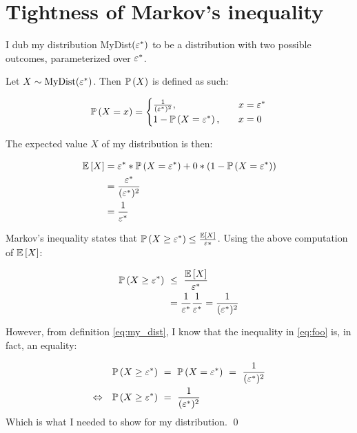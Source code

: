 \section{Tightness of Markov's inequality}

I dub my distribution MyDist$(\varepsilon^\ast)$ to be a distribution with two possible
outcomes, parameterized over $\varepsilon^\ast$.

\medskip

\noindent Let $X \sim \text{MyDist}(\varepsilon^\ast)$. Then $\mathbb P \left(X\right)$ is defined as
such:

\begin{align}
  \mathbb P \left(X = x\right) =
  \begin{cases}
    \frac{1}{(\varepsilon^\ast)^2},\quad &x = \varepsilon^\ast\\
    1 - \mathbb P \left(X = \varepsilon^\ast\right),\quad &x = 0
  \end{cases}\label{eq:my_dist}
\end{align}

The expected value $X$ of my distribution is then:

\begin{align*}
  \mathbb E \left[X\right] &= \varepsilon^\ast * \mathbb P \left(X = \varepsilon^\ast\right) + 0 * (1 - \mathbb P \left(X = \varepsilon^\ast\right))\\
         &= \frac{\varepsilon^\ast}{(\varepsilon^\ast)^2}\\
         &= \frac{1}{\varepsilon^\ast}
\end{align*}

Markov's inequality states that $\mathbb P \left(X \geq \varepsilon^\ast\right) \leq
\frac{\mathbb E \left[X\right]}{\varepsilon\ast}$. Using the above computation of $\mathbb E \left[X\right]$:

\begin{align}
  \mathbb P \left(X \geq \varepsilon^\ast\right)                     \ &\leq\
  \frac{\mathbb E \left[X\right]}{\varepsilon^\ast}\label{eq:foo}\\
  &= \frac{1}{\varepsilon^\ast}\frac{1}{\varepsilon^\ast} = \frac{1}{(\varepsilon^\ast)^2}\nonumber
\end{align}

However, from definition \ref{eq:my_dist}, I know that the inequality in \cref{eq:foo} is, in fact, an equality:

\begin{align*}
  &\PP{X \geq \eps^\ast} \ = \ \PP{X = \eps^\ast}\ =\ \frac{1}{(\eps^\ast)^2}\\
  \Leftrightarrow\quad &\PP{X \geq \eps^\ast}\ =\  \frac{1}{(\eps^\ast)^2}
\end{align*}
Which is what I needed to show for my distribution.
\qed

\sectend
